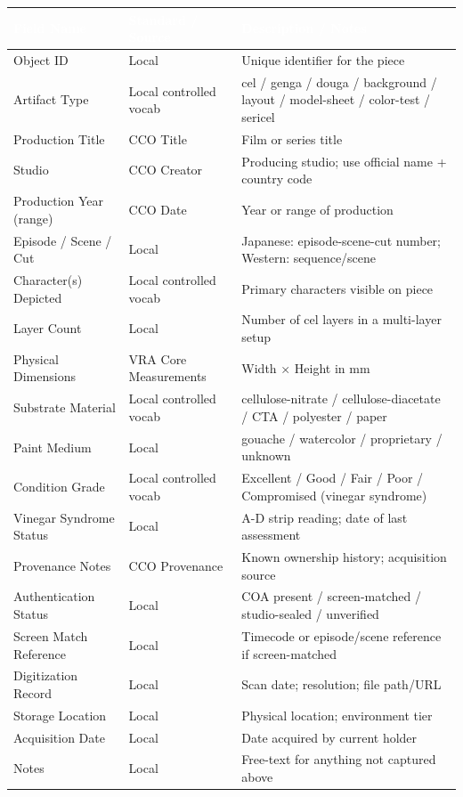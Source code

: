 \documentclass[11pt,letterpaper]{article}
\newcommand{\tableheader}[1]{\textbf{\sffamily\textcolor{white}{#1}}}
\begin{document}
\begin{center}
\begin{tabularx}{\textwidth}{L{3.5cm}L{2.5cm}X}
\toprule
{}
\tableheader{Field Name} & \tableheader{Standard / Source} & \tableheader{Description / Notes} \\
\midrule
Object ID & Local & Unique identifier for the piece \\
Artifact Type & Local controlled vocab & cel / genga / douga / background / layout / model-sheet / color-test / sericel \\
Production Title & CCO Title & Film or series title \\
Studio & CCO Creator & Producing studio; use official name + country code \\
Production Year (range) & CCO Date & Year or range of production \\
Episode / Scene / Cut & Local & Japanese: episode-scene-cut number; Western: sequence/scene \\
Character(s) Depicted & Local controlled vocab & Primary characters visible on piece \\
Layer Count & Local & Number of cel layers in a multi-layer setup \\
Physical Dimensions & VRA Core Measurements & Width × Height in mm \\
Substrate Material & Local controlled vocab & cellulose-nitrate / cellulose-diacetate / CTA / polyester / paper \\
Paint Medium & Local & gouache / watercolor / proprietary / unknown \\
Condition Grade & Local controlled vocab & Excellent / Good / Fair / Poor / Compromised (vinegar syndrome) \\
Vinegar Syndrome Status & Local & A-D strip reading; date of last assessment \\
Provenance Notes & CCO Provenance & Known ownership history; acquisition source \\
Authentication Status & Local & COA present / screen-matched / studio-sealed / unverified \\
Screen Match Reference & Local & Timecode or episode/scene reference if screen-matched \\
Digitization Record & Local & Scan date; resolution; file path/URL \\
Storage Location & Local & Physical location; environment tier \\
Acquisition Date & Local & Date acquired by current holder \\
Notes & Local & Free-text for anything not captured above \\
\bottomrule
\end{tabularx}
\end{center}
\end{document}
